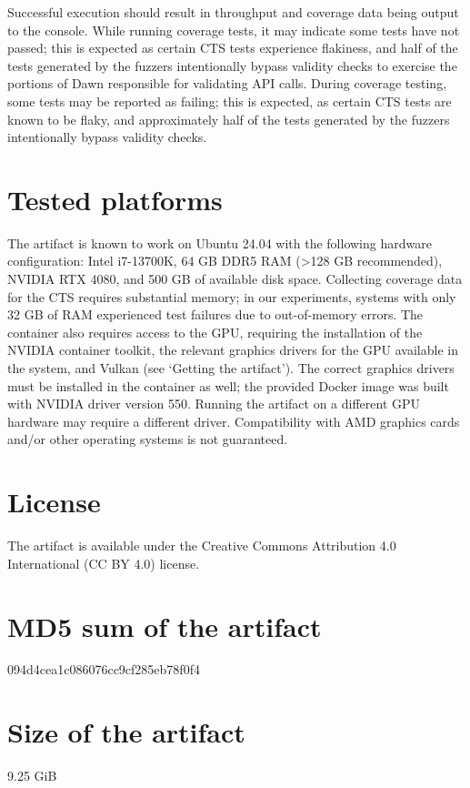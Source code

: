 \documentclass[a4paper,UKenglish]{darts-v2021}
\newenvironment{platforms}{\section{Tested platforms}}{}
\newcommand{\license}[1]{{\section{License}#1}}
\newcommand{\mdsum}[1]{{\section{MD5 sum of the artifact}#1}}
\newcommand{\artifactsize}[1]{{\section{Size of the artifact}#1}}
\begin{document}
Successful execution should result in throughput and coverage data being output to the console. While running coverage tests, it may indicate some tests have not passed; this is expected as certain CTS tests experience flakiness, and half of the tests generated by the fuzzers intentionally bypass validity checks to exercise the portions of Dawn responsible for validating API calls.
During coverage testing, some tests may be reported as failing; this is expected, as certain CTS tests are known to be flaky, and approximately half of the tests generated by the fuzzers intentionally bypass validity checks.
\begin{platforms}
The artifact is known to work on Ubuntu 24.04 with the following hardware configuration: Intel i7-13700K, 64 GB DDR5 RAM (>128 GB recommended), NVIDIA RTX 4080, and 500 GB of available disk space. 
Collecting coverage data for the CTS requires substantial memory; in our experiments, systems with only 32 GB of RAM experienced test failures due to out-of-memory errors.
The container also requires access to the GPU, requiring the installation of the NVIDIA container toolkit, the relevant graphics drivers for the GPU available in the system, and Vulkan (see `Getting the artifact').
The correct graphics drivers must be installed in the container as well; the provided Docker image was built with NVIDIA driver version 550. Running the artifact on a different GPU hardware may require a different driver.
Compatibility with AMD graphics cards and/or other operating systems is not guaranteed. 
\end{platforms}

\license{The artifact is available under the Creative Commons Attribution 4.0 International (CC BY 4.0) license.}

\mdsum{094d4cea1c086076cc9cf285eb78f0f4}

\artifactsize{9.25 GiB}
\end{document}
